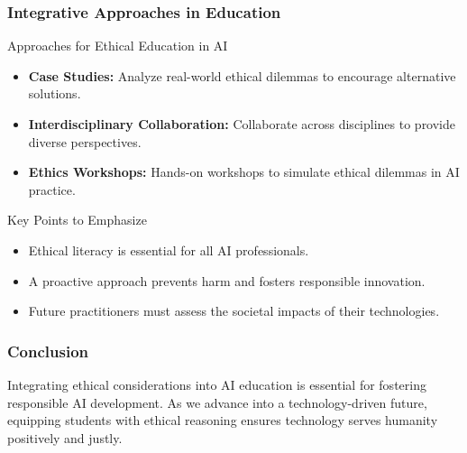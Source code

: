 \documentclass{beamer}
\begin{document}
\begin{frame}[fragile]
    \frametitle{Integrative Approaches in Education}
    \begin{block}{Approaches for Ethical Education in AI}
        \begin{itemize}
            \item \textbf{Case Studies:} Analyze real-world ethical dilemmas to encourage alternative solutions.
            \item \textbf{Interdisciplinary Collaboration:} Collaborate across disciplines to provide diverse perspectives.
            \item \textbf{Ethics Workshops:} Hands-on workshops to simulate ethical dilemmas in AI practice.
        \end{itemize}
    \end{block}
    \begin{block}{Key Points to Emphasize}
        \begin{itemize}
            \item Ethical literacy is essential for all AI professionals.
            \item A proactive approach prevents harm and fosters responsible innovation.
            \item Future practitioners must assess the societal impacts of their technologies.
        \end{itemize}
    \end{block}
\end{frame}

\begin{frame}[fragile]
    \frametitle{Conclusion}
    Integrating ethical considerations into AI education is essential for fostering responsible AI development. As we advance into a technology-driven future, equipping students with ethical reasoning ensures technology serves humanity positively and justly.
\end{frame}
\end{document}
